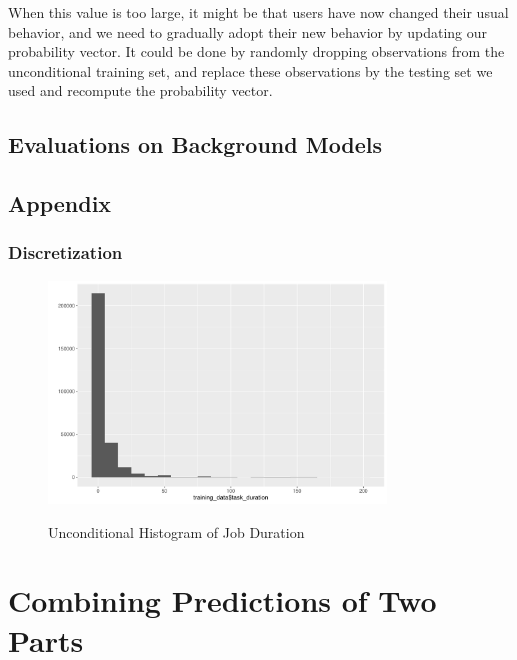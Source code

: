 \documentclass{article}
\begin{document}
\begin{flushleft}
When this value is too large, it might be that users have now changed their
usual behavior, and we need to gradually adopt their new behavior by updating
our probability vector. It could be done by randomly dropping observations from
the unconditional training set, and replace these observations by the testing
set we used and recompute the probability vector.
\end{flushleft}

\subsection{Evaluations on Background Models}

\subsection{Appendix}

\subsubsection{Discretization}

\begin{figure}[htbp]
\caption{Unconditional Histogram of Job Duration}
\centering
\includegraphics[width = 0.8\textwidth]{uncondional_hist}
\label{fig:fig2.2.1}
\end{figure}

\section{Combining Predictions of Two Parts}
\end{document}
